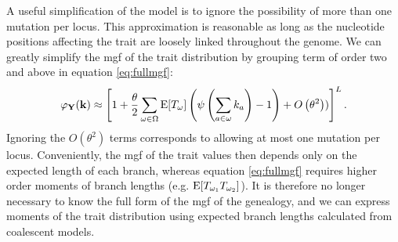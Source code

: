 A useful simplification of the model is to ignore the possibility of more than
one mutation per locus. This approximation is reasonable as long as the
nucleotide positions affecting the trait are loosely linked throughout the
genome. We can greatly simplify the mgf of the trait distribution by grouping
term of order two and above in equation \eqref{eq:fullmgf}:
\begin{equation}
\label{eq:lowmut}
\varphi_{\mathbf{Y}}(\mathbf{k}) \approx \left[ 1 + \frac{\theta}{2} \sum_{\omega \in \Omega}
  \mathrm{E}[T_\omega] \left( \psi\left( \sum_{a \in \omega} k_a\right) -1 \right) +
  O\left( \theta^2 \right))\right]^L.
\end{equation}
Ignoring the $O\left( \theta^2 \right)$ terms corresponds to allowing at most
one mutation per locus. Conveniently, the mgf of the trait values then depends
only on the expected length of each branch, whereas equation \eqref{eq:fullmgf}
requires higher order moments of branch lengths (e.g.
$\mathrm{E}[T_{\omega_1}T_{\omega_2}]$). It is therefore no longer necessary to know the
full form of the mgf of the genealogy, and we can express moments of the trait
distribution using expected branch lengths calculated from coalescent models.

